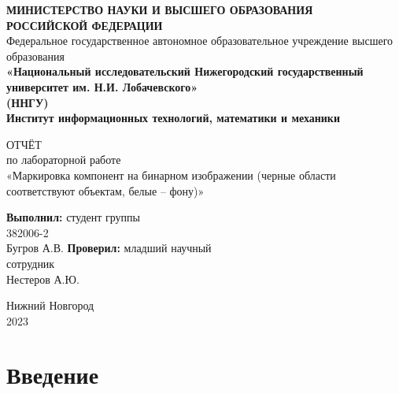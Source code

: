 \documentclass[14pt]{extarticle}
\title{}
\author{}
\date{}
\begin{document}
	\begin{titlepage}
		\begin{center}
			{\bfseries МИНИСТЕРСТВО НАУКИ И ВЫСШЕГО ОБРАЗОВАНИЯ \\
				РОССИЙСКОЙ ФЕДЕРАЦИИ}
			\\
			Федеральное государственное автономное образовательное учреждение высшего образования
			\\
			{\bfseries «Национальный исследовательский Нижегородский государственный университет им. Н.И. Лобачевского»\\(ННГУ)
				\\Институт информационных технологий, математики и механики} \\
		\end{center}

		\vspace{8em}

		\begin{center}
			ОТЧЁТ \\ по лабораторной работе \\
			«Маркировка компонент на бинарном изображении (черные области соответствуют объектам, белые – фону)»
		\end{center}

		\vspace{5em}


		\begin{flushright}
			{\bfseries Выполнил:} студент группы\\382006-2\\Бугров А.В. \underline{\hspace{3cm}} \linebreak\linebreak\linebreak
			{\bfseries Проверил:} младший научный\\ сотрудник\\Нестеров А.Ю. \underline{\hspace{3cm}}
		\end{flushright}


		\vspace{\fill}

		\begin{center}
			Нижний Новгород\\2023
		\end{center}

	\end{titlepage}
 \newpage
\tableofcontents
\newpage
\section{Введение}
\end{document}

